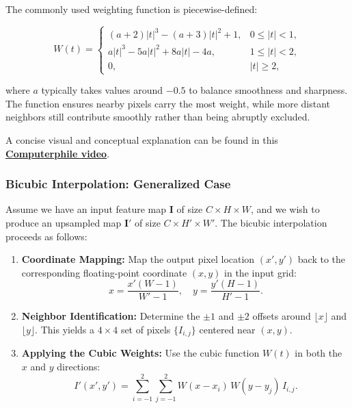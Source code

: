 \noindent The commonly used weighting function is piecewise-defined:

\[
W(t) =
\begin{cases}
	(a + 2)|t|^3 - (a + 3)|t|^2 + 1, & 0 \leq |t| < 1, \\
	a|t|^3 - 5a|t|^2 + 8a|t| - 4a, & 1 \leq |t| < 2, \\
	0, & |t| \geq 2,
\end{cases}
\]

\noindent where \(a\) typically takes values around \(-0.5\) to balance smoothness and sharpness. The function ensures nearby pixels carry the most weight, while more distant neighbors still contribute smoothly rather than being abruptly excluded.

\noindent A concise visual and conceptual explanation can be found in this 
\href{https://www.youtube.com/watch?v=poY_nGzEEWM&ab_channel=Computerphile}{\textbf{Computerphile video}}.

\newpage

\subsubsection{Bicubic Interpolation: Generalized Case}

\noindent Assume we have an input feature map \(\mathbf{I}\) of size \(C \times H \times W\), and we wish to produce an upsampled map \(\mathbf{I'}\) of size \(C \times H' \times W'\). The bicubic interpolation proceeds as follows:

\begin{enumerate}
	\item \textbf{Coordinate Mapping:}  
	Map the output pixel location \((x',y')\) back to the corresponding floating-point coordinate \((x,y)\) in the input grid:
	\[
	x = \frac{x'(W - 1)}{W' - 1}, 
	\quad
	y = \frac{y'(H - 1)}{H' - 1}.
	\]
	
	\item \textbf{Neighbor Identification:}  
	Determine the \(\pm1\) and \(\pm2\) offsets around \(\lfloor x \rfloor\) and \(\lfloor y \rfloor\). This yields a \(4 \times 4\) set of pixels \(\{I_{i,j}\}\) centered near \((x,y)\). 
	
	\item \textbf{Applying the Cubic Weights:}  
	Use the cubic function \(W(t)\) in both the \(x\) and \(y\) directions:
	\[
	I'(x', y') = \sum_{i=-1}^{2}\sum_{j=-1}^{2} 
	W(x - x_i)\,W(y - y_j)\,I_{i,j}.
	\]
\end{enumerate}

